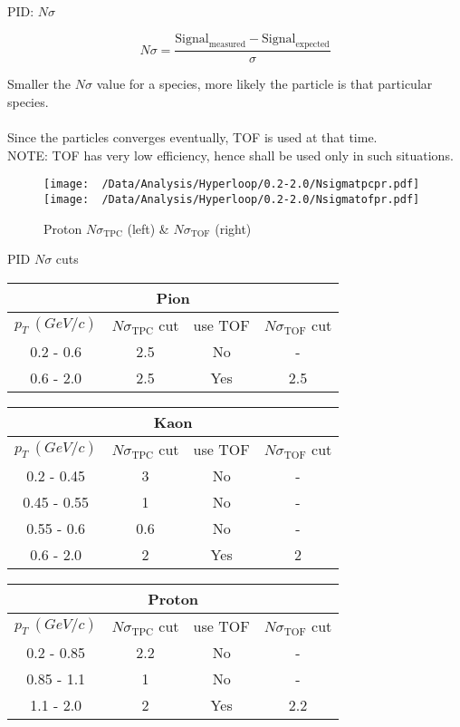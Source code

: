 \documentclass{beamer}
\begin{document}
\begin{frame}{PID: $N\sigma$}
	\begin{definition}
		\[N\sigma=\frac{\mathrm{Signal}_\mathrm{measured}-\mathrm{Signal}_\mathrm{expected}}{\sigma}\]
	\end{definition}
\footnotesize
Smaller the $N\sigma$ value for a species, more likely the particle is that particular species.\\~\\
Since the particles converges eventually, TOF is used at that time.\\
NOTE: TOF has very low efficiency, hence shall be used only in such situations.
\begin{figure}
	\texttt{[image: ~/Data/Analysis/Hyperloop/0.2-2.0/Nsigmatpcpr.pdf]}\texttt{[image: ~/Data/Analysis/Hyperloop/0.2-2.0/Nsigmatofpr.pdf]}
	\caption{\tiny Proton $N\sigma_\mathrm{TPC}$ (left) \& $N\sigma_\mathrm{TOF}$ (right)}
\end{figure}
\end{frame}
\begin{frame}{PID $N\sigma$ cuts}
	\begin{table}[H]
		\centering
		\begin{tabular}{|c|c|c|c|}
			\hline
			\multicolumn{4}{|c|}{Pion} \\
			\hline
			$p_T\ (GeV/c)$ & $N\sigma_\mathrm{TPC}$ cut & use TOF & $N\sigma_\mathrm{TOF}$ cut \\
			\hline
			0.2 - 0.6 & 2.5 & No & - \\
			0.6 - 2.0 & 2.5 & Yes & 2.5 \\
			\hline
		\end{tabular}
		\begin{tabular}{|c|c|c|c|}
			\hline
			\multicolumn{4}{|c|}{Kaon} \\
			\hline
			$p_T\ (GeV/c)$ & $N\sigma_\mathrm{TPC}$ cut & use TOF & $N\sigma_\mathrm{TOF}$ cut \\
			\hline
			0.2 - 0.45 & 3 & No & - \\
			0.45 - 0.55 & 1 & No & - \\
			0.55 - 0.6 & 0.6 & No & -\\
			0.6 - 2.0 & 2 & Yes & 2 \\
			\hline
		\end{tabular}
		\begin{tabular}{|c|c|c|c|}
			\hline
			\multicolumn{4}{|c|}{Proton} \\
			\hline
			$p_T\ (GeV/c)$ & $N\sigma_\mathrm{TPC}$ cut & use TOF & $N\sigma_\mathrm{TOF}$ cut \\
			\hline
			0.2 - 0.85 & 2.2 & No & - \\
			0.85 - 1.1 & 1 & No & - \\
			1.1 - 2.0 & 2 & Yes & 2.2 \\
			\hline
		\end{tabular}
	\end{table}
\end{frame}
\end{document}

